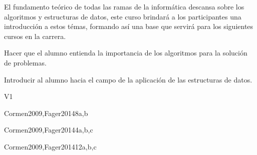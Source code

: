 \begin{syllabus}


\begin{justification}
El fundamento teórico de todas las ramas de la informática descansa sobre los algoritmos y estructuras de datos, este curso brindará a los participantes una introducción a estos témas, formando así­ una base que servirá para los siguientes cursos en la carrera.
\end{justification}

\begin{goals}
\item Hacer que el alumno entienda la importancia de los algoritmos para la solución de problemas.
\item Introducir al alumno hacia el campo de la aplicación de las estructuras de datos.
\end{goals}

\begin{outcomes}{V1}
   \item {}
   \item {}
   \item {}
   \item {}
   \item {}
   \item {}
   \item {}
\end{outcomes}

\begin{unit}{\SDFFundamentalDataStructures}{}{Cormen2009,Fager2014}{8}{a,b}
   \SDFFundamentalDataStructuresAllTopics
   \SDFFundamentalDataStructuresAllLearningOutcomes
\end{unit}

\begin{unit}{\SDFFundamentalProgrammingConcepts}{}{Cormen2009,Fager2014}{4}{a,b,c}
   \SDFFundamentalProgrammingConceptsAllTopics
   \SDFFundamentalProgrammingConceptsAllLearningOutcomes
\end{unit}

\begin{unit}{\ALAlgorithmicStrategies}{}{Cormen2009,Fager2014}{12}{a,b,c}
   \ALAlgorithmicStrategiesAllTopics
   \ALAlgorithmicStrategiesAllLearningOutcomes
\end{unit}


\end{syllabus}
